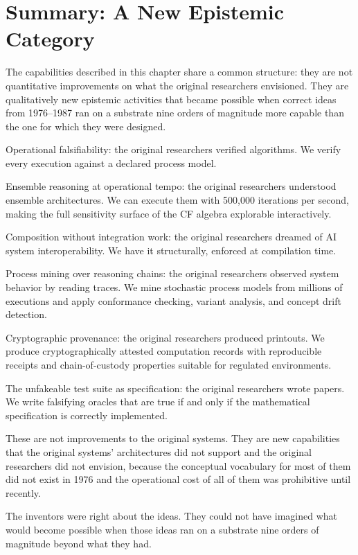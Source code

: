 \section{Summary: A New Epistemic Category}
\label{sec:summary}

The capabilities described in this chapter share a common structure: they are not quantitative
improvements on what the original researchers envisioned. They are qualitatively new epistemic
activities that became possible when correct ideas from 1976--1987 ran on a substrate nine
orders of magnitude more capable than the one for which they were designed.

Operational falsifiability: the original researchers verified algorithms. We verify every
execution against a declared process model.

Ensemble reasoning at operational tempo: the original researchers understood ensemble
architectures. We can execute them with 500,000 iterations per second, making the full
sensitivity surface of the CF algebra explorable interactively.

Composition without integration work: the original researchers dreamed of AI system
interoperability. We have it structurally, enforced at compilation time.

Process mining over reasoning chains: the original researchers observed system behavior
by reading traces. We mine stochastic process models from millions of executions and
apply conformance checking, variant analysis, and concept drift detection.

Cryptographic provenance: the original researchers produced printouts. We produce
cryptographically attested computation records with reproducible receipts and chain-of-custody
properties suitable for regulated environments.

The unfakeable test suite as specification: the original researchers wrote papers. We write
falsifying oracles that are true if and only if the mathematical specification is correctly
implemented.

These are not improvements to the original systems. They are new capabilities that the
original systems' architectures did not support and the original researchers did not envision,
because the conceptual vocabulary for most of them did not exist in 1976 and the operational
cost of all of them was prohibitive until recently.

The inventors were right about the ideas. They could not have imagined what would become
possible when those ideas ran on a substrate nine orders of magnitude beyond what they had.
